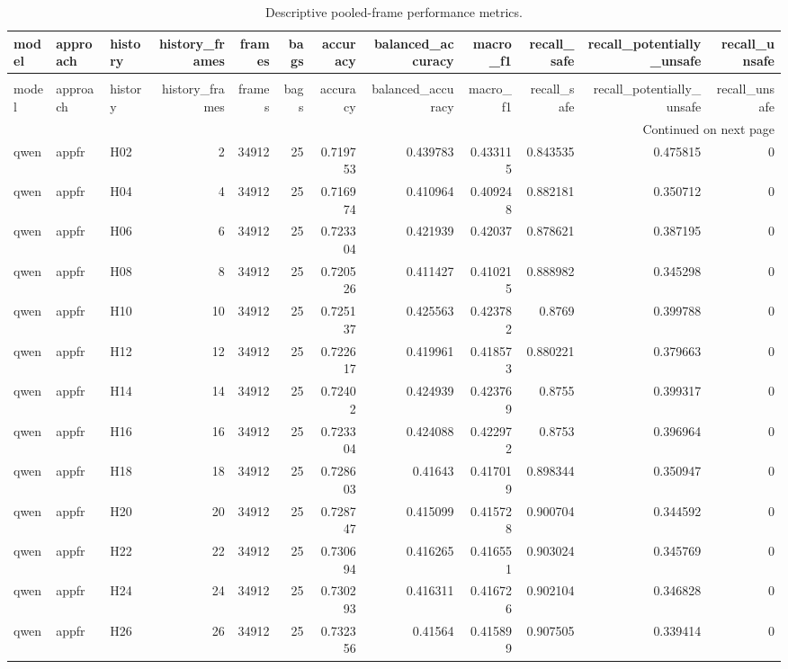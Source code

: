 \begin{longtable}{lllrrrrrrrrr}
\caption{Descriptive pooled-frame performance metrics.} \label{tab:rq3-pooled-metrics} \\
\toprule
model & approach & history & history\_frames & frames & bags & accuracy & balanced\_accuracy & macro\_f1 & recall\_safe & recall\_potentially\_unsafe & recall\_unsafe \\
\midrule
\endfirsthead
\caption[]{Descriptive pooled-frame performance metrics.} \\
\toprule
model & approach & history & history\_frames & frames & bags & accuracy & balanced\_accuracy & macro\_f1 & recall\_safe & recall\_potentially\_unsafe & recall\_unsafe \\
\midrule
\endhead
\midrule
\multicolumn{12}{r}{Continued on next page} \\
\midrule
\endfoot
\bottomrule
\endlastfoot
qwen & appfr & H02 & 2 & 34912 & 25 & 0.719753 & 0.439783 & 0.433115 & 0.843535 & 0.475815 & 0 \\
qwen & appfr & H04 & 4 & 34912 & 25 & 0.716974 & 0.410964 & 0.409248 & 0.882181 & 0.350712 & 0 \\
qwen & appfr & H06 & 6 & 34912 & 25 & 0.723304 & 0.421939 & 0.42037 & 0.878621 & 0.387195 & 0 \\
qwen & appfr & H08 & 8 & 34912 & 25 & 0.720526 & 0.411427 & 0.410215 & 0.888982 & 0.345298 & 0 \\
qwen & appfr & H10 & 10 & 34912 & 25 & 0.725137 & 0.425563 & 0.423782 & 0.8769 & 0.399788 & 0 \\
qwen & appfr & H12 & 12 & 34912 & 25 & 0.722617 & 0.419961 & 0.418573 & 0.880221 & 0.379663 & 0 \\
qwen & appfr & H14 & 14 & 34912 & 25 & 0.72402 & 0.424939 & 0.423769 & 0.8755 & 0.399317 & 0 \\
qwen & appfr & H16 & 16 & 34912 & 25 & 0.723304 & 0.424088 & 0.422972 & 0.8753 & 0.396964 & 0 \\
qwen & appfr & H18 & 18 & 34912 & 25 & 0.728603 & 0.41643 & 0.417019 & 0.898344 & 0.350947 & 0 \\
qwen & appfr & H20 & 20 & 34912 & 25 & 0.728747 & 0.415099 & 0.415728 & 0.900704 & 0.344592 & 0 \\
qwen & appfr & H22 & 22 & 34912 & 25 & 0.730694 & 0.416265 & 0.416551 & 0.903024 & 0.345769 & 0 \\
qwen & appfr & H24 & 24 & 34912 & 25 & 0.730293 & 0.416311 & 0.416726 & 0.902104 & 0.346828 & 0 \\
qwen & appfr & H26 & 26 & 34912 & 25 & 0.732356 & 0.41564 & 0.415899 & 0.907505 & 0.339414 & 0 \\

\end{longtable}
